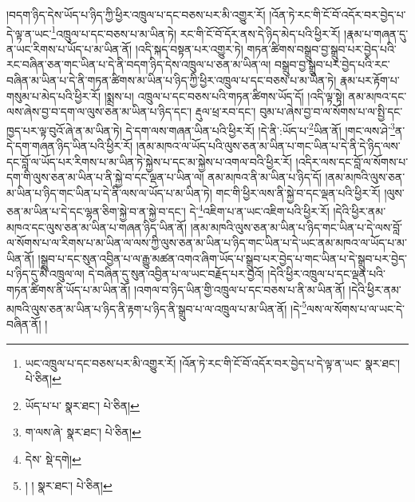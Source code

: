 །བདག་ཉིད་དེས་ཡོད་པ་ཉིད་ཀྱི་ཕྱིར་འཁྲུལ་པ་དང་བཅས་པར་མི་འགྱུར་རོ། །འོན་ཏེ་རང་གི་ངོ་བོ་འདོར་བར་བྱེད་པ་དེ་ལྟ་ན་ཡང་\footnote{ཡང་འཁྲུལ་པ་དང་བཅས་པར་མི་འགྱུར་རོ། །འོན་ཏེ་རང་གི་ངོ་བོ་འདོར་བར་བྱེད་པ་དེ་ལྟ་ན་ཡང་  སྣར་ཐང་།  པེ་ཅིན། }འཁྲུལ་པ་དང་བཅས་པ་མ་ཡིན་ཏེ། རང་གི་ངོ་བོ་དོར་ནས་དེ་ཉིད་མེད་པའི་ཕྱིར་རོ། །རྣམ་པ་གཞན་དུ་ན་ཡང་རིགས་པ་ཡོད་པ་མ་ཡིན་ནོ། །འདི་སྐད་བསྟན་པར་འགྱུར་ཏེ། གཏན་ཚིགས་བསྒྲུབ་བྱ་སྒྲུབ་པར་བྱེད་པའི་རང་བཞིན་ཅན་གང་ཡིན་པ་དེ་ནི་བདག་ཉིད་དེས་འཁྲུལ་པ་ཅན་མ་ཡིན་ལ། བསྒྲུབ་བྱ་སྒྲུབ་པར་བྱེད་པའི་རང་བཞིན་མ་ཡིན་པ་དེ་ནི་གཏན་ཚིགས་མ་ཡིན་པ་ཉིད་ཀྱི་ཕྱིར་འཁྲུལ་པ་དང་བཅས་པ་མ་ཡིན་ཏེ། རྣམ་པར་རྟོག་པ་གསུམ་པ་མེད་པའི་ཕྱིར་རོ། །སྨྲས་པ། འཁྲུལ་པ་དང་བཅས་པའི་གཏན་ཚིགས་ཡོད་དོ། །འདི་ལྟ་སྟེ། ནམ་མཁའ་དང་ལས་ཞེས་བྱ་བ་དག་ལ་ལུས་ཅན་མ་ཡིན་པ་ཉིད་དང་། རྡུལ་ཕྲ་རབ་དང་། བུམ་པ་ཞེས་བྱ་བ་ལ་སོགས་པ་ལ་སྤྱི་དང་ཁྱད་པར་ལྟ་བུའོ་ཞེ་ན་མ་ཡིན་ཏེ། དེ་དག་ལས་གཞན་ཡིན་པའི་ཕྱིར་རོ། །དེ་ནི་:ཡོད་པ་\footnote{ཡོད་པ་པ་  སྣར་ཐང་།  པེ་ཅིན། }ཡིན་ནོ། །གང་ལས་ཤེ་\footnote{ག་ལས་ཞེ་  སྣར་ཐང་།  པེ་ཅིན། }ན་དེ་དག་གཞན་ཉིད་ཡིན་པའི་ཕྱིར་རོ། །ནམ་མཁའ་ལ་ཡོད་པའི་ལུས་ཅན་མ་ཡིན་པ་གང་ཡིན་པ་དེ་ནི་དེ་ཉིད་ལས་དང་བློ་ལ་ཡོད་པར་རིགས་པ་མ་ཡིན་ཏེ་སྐྱེས་པ་དང་མ་སྐྱེས་པ་འགལ་བའི་ཕྱིར་རོ། །འདིར་ལས་དང་བློ་ལ་སོགས་པ་དག་གི་ལུས་ཅན་མ་ཡིན་པ་ནི་སྐྱེ་བ་དང་ལྡན་པ་ཡིན་ལ། ནམ་མཁའ་ནི་མ་ཡིན་པ་ཉིད་དོ། །ནམ་མཁའི་ལུས་ཅན་མ་ཡིན་པ་ཉིད་གང་ཡིན་པ་དེ་ནི་ལས་ལ་ཡོད་པ་མ་ཡིན་ཏེ། གང་གི་ཕྱིར་ལས་ནི་སྐྱེ་བ་དང་ལྡན་པའི་ཕྱིར་རོ། །ལུས་ཅན་མ་ཡིན་པ་དེ་དང་ལྷན་ཅིག་སྐྱེ་བ་ན་སྐྱེ་བ་དང་། དེ་\footnote{དེས་  སྡེ་དགེ། }འཇིག་པ་ན་ཡང་འཇིག་པའི་ཕྱིར་རོ། །དེའི་ཕྱིར་ནམ་མཁའ་དང་ལུས་ཅན་མ་ཡིན་པ་གཞན་ཉིད་ཡིན་ནོ། །ནམ་མཁའི་ལུས་ཅན་མ་ཡིན་པ་ཉིད་གང་ཡིན་པ་དེ་ལས་བློ་ལ་སོགས་པ་ལ་རིགས་པ་མ་ཡིན་ལ་ལས་ཀྱི་ལུས་ཅན་མ་ཡིན་པ་ཉིད་གང་ཡིན་པ་དེ་ཡང་ནམ་མཁའ་ལ་ཡོད་པ་མ་ཡིན་ནོ། །སྒྲུབ་པ་དང་སུན་འབྱིན་པ་ལ་རྒྱུ་མཚན་འགའ་ཞིག་ཡོད་པ་སྒྲུབ་པར་བྱེད་པ་གང་ཡིན་པ་དེ་སྒྲུབ་པར་བྱེད་པ་ཉིད་དུ་མི་འཁྲུལ་ལ། དེ་བཞིན་དུ་སུན་འབྱིན་པ་ལ་ཡང་བརྗོད་པར་བྱའོ། །དེའི་ཕྱིར་འཁྲུལ་པ་དང་ལྡན་པའི་གཏན་ཚིགས་ནི་ཡོད་པ་མ་ཡིན་ནོ། །འགལ་བ་ཉིད་ཡིན་གྱི་འཁྲུལ་པ་དང་བཅས་པ་ནི་མ་ཡིན་ནོ། །དེའི་ཕྱིར་ནམ་མཁའི་ལུས་ཅན་མ་ཡིན་པ་ཉིད་ནི་རྟག་པ་ཉིད་ནི་སྒྲུབ་པ་ལ་འཁྲུལ་པ་མ་ཡིན་ནོ། །དེ་\footnote{། །  སྣར་ཐང་།  པེ་ཅིན། }ལས་ལ་སོགས་པ་ལ་ཡང་དེ་བཞིན་ནོ། །
